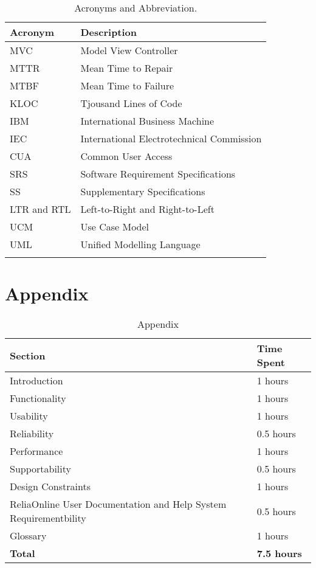 \documentclass{article}
\begin{document}
\begin{longtable}{|p{4.5cm}|p{6.5cm}|}\hline
    \textbf{Acronym} & \textbf{Description}  \\ \hline
    MVC & Model View Controller \\ \hline
    MTTR & Mean Time to Repair \\ \hline
    MTBF & Mean Time to Failure \\ \hline
    KLOC & Tjousand Lines of Code \\ \hline
    IBM & International Business Machine \\ \hline
    IEC & International Electrotechnical Commission \\ \hline
    CUA & Common User Access\\ \hline
    SRS & Software Requirement Specifications\\ \hline
    SS & Supplementary Specifications\\ \hline
    LTR and RTL & Left-to-Right and Right-to-Left\\ \hline
    UCM& Use Case Model\\ \hline
    UML& Unified Modelling Language\\ \hline
         \caption{Acronyms and Abbreviation.\label{long}}\\
\end{longtable}

\section{Appendix}
\begin{table}[htb!]
    \centering
    \begin{tabular}{|p{5.5cm}|p{6.5cm}|}\hline
    \textbf{Section} & \textbf{Time Spent} \\ \hline
    Introduction & 1 hours \\ \hline
    Functionality & 1 hours \\ \hline
    Usability & 1 hours \\ \hline
    Reliability & 0.5 hours \\ \hline
    Performance & 1 hours \\ \hline
    Supportability & 0.5 hours \\ \hline
    Design Constraints & 1 hours \\ \hline
    ReliaOnline User Documentation and Help System Requirementbility & 0.5 hours \\ \hline
    Glossary & 1 hours \\ \hline
    \textbf{Total} & \textbf{7.5 hours} \\ \hline
\end{tabular}
    \caption{Appendix}
    \label{tab:my_label}
\end{table}
\end{document}
